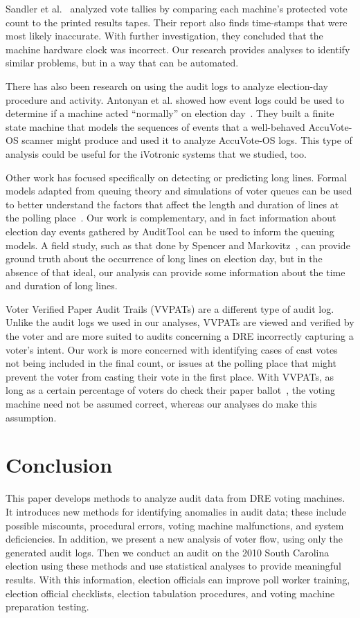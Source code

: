 \documentclass[letterpaper,twocolumn,10pt]{article}
\begin{document}
Sandler et al.~\cite{Sandler2007} analyzed vote tallies by comparing each
machine’s protected vote count to the printed results tapes. Their report also
finds time-stamps that were most likely inaccurate. With further investigation,
they concluded that the machine hardware clock was incorrect. Our research
provides analyses to identify similar problems, but in a way that can be
automated.   

There has also been research on using the audit logs to analyze election-day
procedure and activity. Antonyan et al. showed how event logs could be used to
determine if a machine acted ``normally'' on election
day~\cite{Antonyan2009}. They built a finite state machine that models the
sequences of events that a well-behaved AccuVote-OS scanner might produce and
used it to analyze AccuVote-OS logs. This type of analysis could be useful for
the iVotronic systems that we studied, too.  

Other work has focused specifically on detecting or predicting long
lines. Formal models adapted from queuing theory and simulations of voter queues
can be used to better understand the factors that affect the length and duration
of lines at the polling place~\cite{Allen2006, Edel2010}. Our work is
complementary, and in fact information about election day events gathered by
AuditTool can be used to inform the queuing models. A field study, such as that
done by Spencer and Markovitz~\cite{Spencer2010}, can provide ground truth about
the occurrence of long lines on election day, but in the absence of that ideal,
our analysis can provide some information about the time and duration of long
lines. 


Voter Verified Paper Audit Trails (VVPATs) are a different type of audit
log. Unlike the audit logs we used in our analyses, VVPATs are viewed and
verified by the voter and are more suited to audits concerning a DRE incorrectly
capturing a voter’s intent. Our work is more concerned with identifying cases of
cast votes not being included in the final count, or issues at the polling place
that might prevent the voter from casting their vote in the first place. With
VVPATs, as long as a certain percentage of voters do check their paper
ballot~\cite{Hall2006}, the voting machine need not be assumed correct, whereas
our analyses do make this assumption. 

\section{Conclusion}
This paper develops methods to analyze audit data from DRE voting machines. It 
introduces new methods for identifying anomalies in audit data; these include 
possible miscounts, procedural errors, voting machine malfunctions, and system 
deficiencies. In addition, we present a new analysis of voter flow, using only 
the generated audit logs.  Then we conduct an audit on the 2010 South Carolina 
election using these methods and use statistical analyses to provide meaningful
results. With this information, election officials can improve poll worker 
training, election official checklists, election tabulation procedures, and 
voting machine preparation testing.  
 
\end{document}
